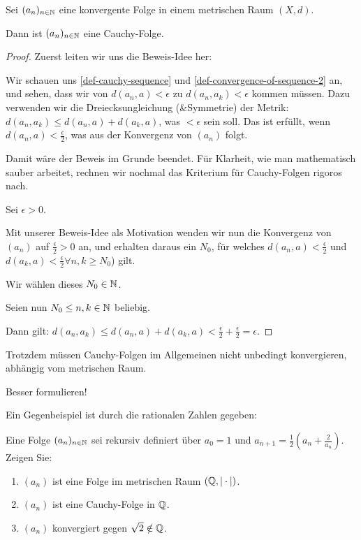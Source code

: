 \begin{lemma}
    \label{lem-convergent-implies-cauchy}
    Sei $(a_n)_{n \in \mathbb{N}}$ eine konvergente Folge in einem metrischen Raum $(X, d)$.

    Dann ist $(a_n)_{n \in \mathbb{N}}$ eine Cauchy-Folge.
\end{lemma}
\begin{proof}
    Zuerst leiten wir uns die Beweis-Idee her:
    
    Wir schauen uns \ref{def-cauchy-sequence} und \ref{def-convergence-of-sequence-2} an, und sehen, dass wir von $d(a_n, a) < \epsilon$ zu $d(a_n, a_k) < \epsilon$ kommen müssen. Dazu verwenden wir die Dreiecksungleichung (\&\;Symmetrie) der Metrik: $d(a_n, a_k) \leq d(a_n, a) + d(a_k, a)$, was $< \epsilon$ sein soll. Das ist erfüllt, wenn $d(a_n, a) < \frac{\epsilon}{2}$, was aus der Konvergenz von $(a_n)$ folgt.
    
    Damit wäre der Beweis im Grunde beendet. Für Klarheit, wie man mathematisch sauber arbeitet, rechnen wir nochmal das Kriterium für Cauchy-Folgen rigoros nach.

    Sei $\epsilon > 0$.

    Mit unserer Beweis-Idee als Motivation wenden wir nun die Konvergenz von $(a_n)$ auf $\frac{\epsilon}{2} > 0$ an, und erhalten daraus ein $N_0$, für welches $d(a_n, a) < \frac{\epsilon}{2}$ und $d(a_k, a) < \frac{\epsilon}{2} \forall n, k \geq N_0$) gilt.

    Wir wählen dieses $N_0 \in \mathbb{N}$.

    Seien nun $N_0 \leq n, k \in \mathbb{N}$ beliebig.

    Dann gilt: $d(a_n, a_k) \leq d(a_n, a) + d(a_k, a) < \frac{\epsilon}{2} + \frac{\epsilon}{2} = \epsilon$.
\end{proof}

Trotzdem müssen Cauchy-Folgen im Allgemeinen nicht unbedingt konvergieren, abhängig vom metrischen Raum.
\begin{query}
    Besser formulieren!
\end{query}
Ein Gegenbeispiel ist durch die rationalen Zahlen gegeben:

\begin{exercise}
    Eine Folge $(a_n)_{n \in \mathbb{N}}$ sei rekursiv definiert über $a_0 = 1$ und $a_{n+1} = \frac{1}{2} (a_n + \frac{2}{a_n})$. Zeigen Sie:
    \begin{enumerate}[label=(\alph*)]
        \item $(a_n)$ ist eine Folge im metrischen Raum $(\mathbb{Q}, |\cdot|)$.
        \item $(a_n)$ ist eine Cauchy-Folge in $\mathbb{Q}$.
        \item $(a_n)$ konvergiert gegen $\sqrt{2} \notin \mathbb{Q}$.
    \end{enumerate}
\end{exercise}

